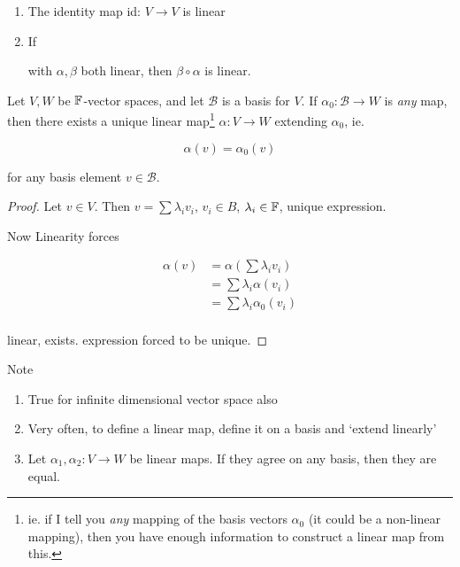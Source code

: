 \documentclass[a4paper]{article}
\begin{document}
\begin{enumerate}
	\item The identity map id: $ V \to V $ is linear
	\item If  with $ \alpha,\beta $ both linear, then $ \beta \circ \alpha $ is linear.
	
\end{enumerate}

\begin{lemma} 
	Let $ V,W $ be $ \mathbb{F} $-vector spaces, and let $ \mathcal{B} $ is a basis for $ V $.
	If $ \alpha_{0} : \mathcal{B} \to W $ is \emph{any} map, then there exists a unique linear map\footnote{ie. if I tell you \emph{any} mapping of the basis vectors $ \alpha_{0} $ (it could be a non-linear mapping), then you have enough information to construct a linear map from this. } $ \alpha : V \to W $ extending $ \alpha_{0} $, ie. 
	
	\[ \alpha(v) = \alpha_{0}(v) \]
	
	for any basis element $ v \in \mathcal{B} $. 

	
\end{lemma}


\begin{proof}
	Let $ v  \in V $. Then $ v = \sum \lambda_{i} v_{i} $, $ v_{i} \in B $, $ \lambda_{i} \in \mathbb{F} $, unique expression. 
	
	Now Linearity forces
	
	\begin{align*}
	\alpha(v) & = \alpha\left( \sum \lambda_{i} v_{i} \right) \\
	& = \sum \lambda_{i} \alpha(v_{i})\\
	& = \sum \lambda_{i} \alpha_{0}(v_{i}) \\
	\end{align*}
	
	linear, exists.
	expression forced to be unique. 
\end{proof}

Note

\begin{enumerate}
	\item True for infinite dimensional vector space also
	\item Very often, to define a linear map, define it on a basis and `extend linearly'
	\item Let $ \alpha_{1},\alpha_{2} : V \to W $ be linear maps. If they agree on any basis, then they are equal. 
\end{enumerate}
\end{document}
